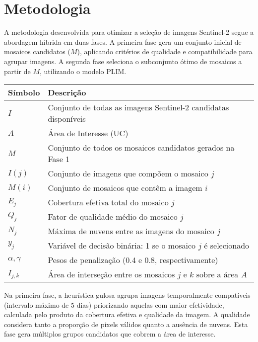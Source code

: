 \documentclass[a4paper,11pt]{article}
\begin{document}
\section{Metodologia}

A metodologia desenvolvida para otimizar a seleção de imagens Sentinel-2 segue a abordagem híbrida em duas fases. A primeira fase gera um conjunto inicial de mosaicos candidatos ($M$), aplicando critérios de qualidade e compatibilidade para agrupar imagens. A segunda fase seleciona o subconjunto ótimo de mosaicos a partir de $M$, utilizando o modelo PLIM.

\begin{table}[ht!]
    \centering
    \begin{tabular}{p{2cm}p{12cm}}
    \toprule
    \textbf{Símbolo} & \textbf{Descrição} \\
    \midrule
    $I$       & Conjunto de todas as imagens Sentinel-2 candidatas disponíveis \\
    $A$       & Área de Interesse (UC) \\
    $M$       & Conjunto de todos os mosaicos candidatos gerados na Fase 1 \\
    $I(j)$    & Conjunto de imagens que compõem o mosaico $j$ \\
    $M(i)$    & Conjunto de mosaicos que contêm a imagem $i$ \\
    $E_j$     & Cobertura efetiva total do mosaico $j$ \\
    $Q_j$     & Fator de qualidade médio do mosaico $j$ \\
    $N_j$     & Máxima de nuvens entre as imagens do mosaico $j$ \\
    $y_j$     & Variável de decisão binária: 1 se o mosaico $j$ é selecionado \\
    $\alpha, \gamma$ & Pesos de penalização (0.4 e 0.8, respectivamente) \\
    $I_{j,k}$ & Área de interseção entre os mosaicos $j$ e $k$ sobre a área $A$ \\
    \bottomrule
    \end{tabular}
\end{table}

Na primeira fase, a heurística gulosa agrupa imagens temporalmente compatíveis (intervalo máximo de 5 dias) priorizando aquelas com maior efetividade, calculada pelo produto da cobertura efetiva e qualidade da imagem. A qualidade considera tanto a proporção de pixels válidos quanto a ausência de nuvens. Esta fase gera múltiplos grupos candidatos que cobrem a área de interesse.
\end{document}
